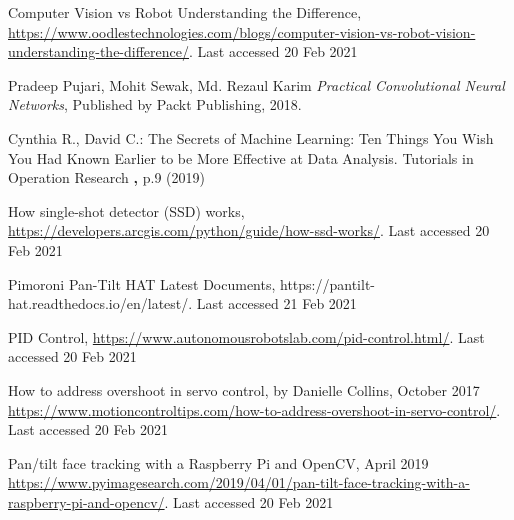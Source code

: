 \documentclass[runningheads]{llncs}
\begin{document}
%
%
%
% 
% 
%

\begin{thebibliography}{8}


Computer Vision vs Robot Understanding the Difference, \url{https://www.oodlestechnologies.com/blogs/computer-vision-vs-robot-vision-understanding-the-difference/}. 
Last accessed 20 Feb 2021


Pradeep Pujari, Mohit Sewak, Md. Rezaul Karim
{\it Practical Convolutional Neural Networks},
Published by Packt Publishing,
2018.


Cynthia R., David C.: The Secrets of Machine Learning: Ten Things
You Wish You Had Known Earlier to be More Effective at Data Analysis. Tutorials in Operation Research \textbf, p.9 (2019)


How single-shot detector (SSD) works,
\url{https://developers.arcgis.com/python/guide/how-ssd-works/}. 
Last accessed 20 Feb 2021


Pimoroni Pan-Tilt HAT Latest Documents,
https://pantilt-hat.readthedocs.io/en/latest/. 
Last accessed 21 Feb 2021

PID Control,
\url{https://www.autonomousrobotslab.com/pid-control.html/}. 
Last accessed 20 Feb 2021

How to address overshoot in servo control, by Danielle Collins, October 2017
\url{https://www.motioncontroltips.com/how-to-address-overshoot-in-servo-control/}. 
Last accessed 20 Feb 2021


Pan/tilt face tracking with a Raspberry Pi and OpenCV, April 2019
\url{https://www.pyimagesearch.com/2019/04/01/pan-tilt-face-tracking-with-a-raspberry-pi-and-opencv/}. 
Last accessed 20 Feb 2021

\end{thebibliography}
\end{document}
